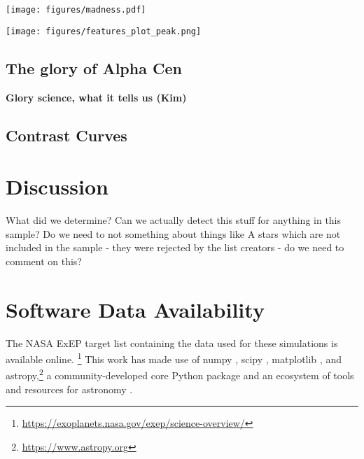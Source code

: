 \documentclass[
    usenatbib,
]{mnras}
\newcommand{\IWA}{\ensuremath{\mathrm{IWA}}}
\begin{document}
\begin{figure*}
    \centering
    \texttt{[image: figures/madness.pdf]}  
    \caption{
        A example of the eccentric orbits generated for the stellar sample. The orbits are scaled by the Earth-equivalent flux distance. The shaded region indicates \IWA's of 1, 2, 3 and 4~$\lambda / D$ corresponding to 21, 42, 63 and 84 mas. The \IWA can significantly affect the range of scattering phases observable with each orbit.
    }
    \label{fig:ball-o-yarn}
\end{figure*}


 
\begin{figure*}
    \centering
    \texttt{[image: figures/features\_plot\_peak.png]}  
    \caption{
        Number of systems vs inner working angle
    }
    \label{fig:accessible_phase_angles}
\end{figure*}

\subsection{The glory of Alpha Cen}
\label{sec:ealpha-cen}
\textbf{Glory science, what it tells us (Kim)}

\subsection{Contrast Curves}
\label{sec:contrast}

\section{Discussion}
What did we determine? Can we actually detect this stuff for anything in this sample? Do we need to not something about things like A stars which are not included in the sample - they were rejected by the list creators - do we need to comment on this? 



\section*{Software Data Availability}
The NASA ExEP target list containing the data used for these simulations is available online.%
\footnote{\url{https://exoplanets.nasa.gov/exep/science-overview/}}
This work has made use of \textsf{numpy}
 \citep{NumPy2020}, \textsf{scipy} \citep{scipy_2020}, \textsf{matplotlib} \citep{matplotlib2007}, and \textsf{astropy},\footnote{\url{https://www.astropy.org}} a community-developed core Python package and an ecosystem of tools and resources for astronomy \citep{astropy:2013, astropy:2018, astropy:2022}.
\end{document}
